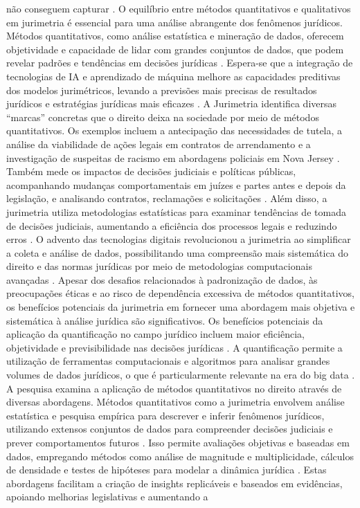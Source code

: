 não conseguem capturar \cite{10.1590/dados.2022.65.3.267,10.1057/s41599-020-0396-5}. O equilíbrio entre métodos quantitativos e qualitativos em jurimetria é essencial para uma análise abrangente dos fenômenos jurídicos. Métodos quantitativos, como análise estatística e mineração de dados, oferecem objetividade e capacidade de lidar com grandes conjuntos de dados, que podem revelar padrões e tendências em decisões jurídicas \cite{10.1177/0094306118767649,de2010jurimetrics}. Espera-se que a integração de tecnologias de IA e aprendizado de máquina melhore as capacidades preditivas dos modelos jurimétricos, levando a previsões mais precisas de resultados jurídicos e estratégias jurídicas mais eficazes \cite{10.1007/s11186-021-09453-1,10.5040/9781350220645}. A Jurimetria identifica diversas “marcas” concretas que o direito deixa na sociedade por meio de métodos quantitativos. Os exemplos incluem a antecipação das necessidades de tutela, a análise da viabilidade de ações legais em contratos de arrendamento e a investigação de suspeitas de racismo em abordagens policiais em Nova Jersey \cite{zabala1809}. Também mede os impactos de decisões judiciais e políticas públicas, acompanhando mudanças comportamentais em juízes e partes antes e depois da legislação, e analisando contratos, reclamações e solicitações \cite{nunes2018}. Além disso, a jurimetria utiliza metodologias estatísticas para examinar tendências de tomada de decisões judiciais, aumentando a eficiência dos processos legais e reduzindo erros \cite{massuanganhe2016, nunes2018}. O advento das tecnologias digitais revolucionou a jurimetria ao simplificar a coleta e análise de dados, possibilitando uma compreensão mais sistemática do direito e das normas jurídicas por meio de metodologias computacionais avançadas \cite{10.1007/s11186-021-09453-1,unger2021process}. Apesar dos desafios relacionados à padronização de dados, às preocupações éticas e ao risco de dependência excessiva de métodos quantitativos, os benefícios potenciais da jurimetria em fornecer uma abordagem mais objetiva e sistemática à análise jurídica são \cite{desafios jurimétricos} significativos. Os benefícios potenciais da aplicação da quantificação no campo jurídico incluem maior eficiência, objetividade e previsibilidade nas decisões jurídicas \cite{silva2023role,nunes2016jurimetria}. A quantificação permite a utilização de ferramentas computacionais e algoritmos para analisar grandes volumes de dados jurídicos, o que é particularmente relevante na era do big data \cite{silva2023role,nunes2016jurimetria}. A pesquisa examina a aplicação de métodos quantitativos no direito através de diversas abordagens. Métodos quantitativos como a jurimetria envolvem análise estatística e pesquisa empírica para descrever e inferir fenômenos jurídicos, utilizando extensos conjuntos de dados para compreender decisões judiciais e prever comportamentos futuros \cite{colombo2017, luvizotto2020, nunes2018, massuanganhe2016}. Isso permite avaliações objetivas e baseadas em dados, empregando métodos como análise de magnitude e multiplicidade, cálculos de densidade e testes de hipóteses para modelar a dinâmica jurídica \cite{nunes2018, nunes2018}. Estas abordagens facilitam a criação de insights replicáveis e baseados em evidências, apoiando melhorias legislativas e aumentando a 